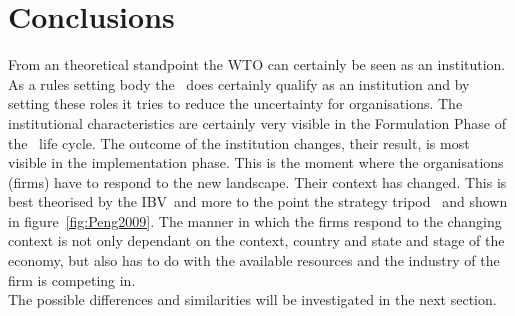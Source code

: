 \section{Conclusions}

From an theoretical standpoint the \gls{WTO} can certainly be seen as an institution.
As a rules setting body the \wto~does certainly qualify as an institution and by setting these roles it tries to reduce the uncertainty for organisations.
The institutional characteristics are certainly very visible in the Formulation Phase of the \wto~life cycle. 
The outcome of the institution changes, their result, is most visible in the implementation phase.
This is the moment where the organisations (firms) have to respond to the new landscape. 
Their context has changed.
This is best theorised by the \gls{IBV}~and more to the point the strategy tripod~\cite{Peng:2009vt} and shown in figure~\ref{fig:Peng2009}.
The manner in which the firms respond to the changing context is not only dependant on the context, country and state and stage of the economy, but also has to do with the available resources and the industry of the firm is competing in. \\
The possible differences and similarities will be investigated in the next section.%

